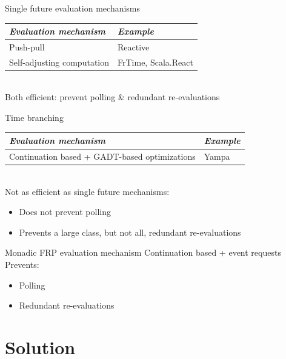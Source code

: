 \documentclass{beamer}
\begin{document}
\begin{frame}{Single future evaluation mechanisms}

\begin{tabular}{l l}
\emph{Evaluation mechanism} & \emph{Example} \\
\hline
Push-pull  & Reactive \\
Self-adjusting computation & FrTime, Scala.React \\
\end{tabular}\\
\vspace{0.2cm}
Both efficient: prevent polling \& redundant re-evaluations
\end{frame}

\begin{frame}{Time branching}
\begin{tabular}{l l}
\emph{Evaluation mechanism} & \emph{Example} \\
\hline
Continuation based + GADT-based optimizations  & Yampa \\
\end{tabular}\\
\vspace{0.2cm}
Not as efficient as single future mechanisms: 
\begin{itemize}
\item Does not prevent polling
\item Prevents a large class, but not all, redundant re-evaluations
\end{itemize}
\end{frame}

\begin{frame}{Monadic FRP evaluation mechanism}
Continuation based + event requests\\
Prevents:
\begin{itemize}
\item Polling
\item Redundant re-evaluations
\end{itemize}

\end{frame}

\newlength{\tmathindenta}
\setlength{\tmathindenta}{\mathindent}
\setlength{\mathindent}{0.05cm}

\section{Solution}
\end{document}
